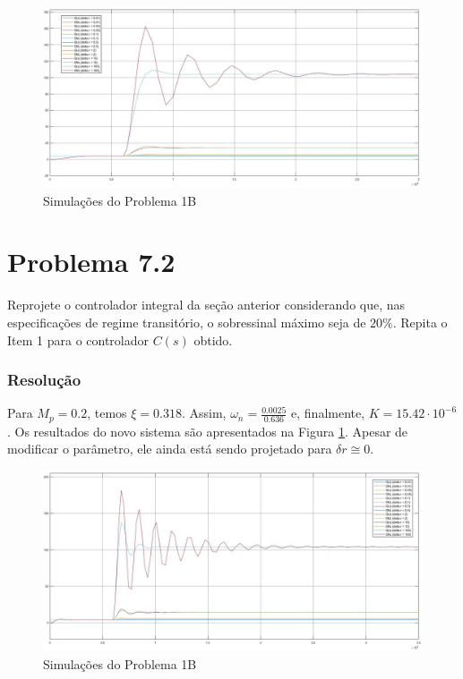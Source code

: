 \documentclass[
]{book}
\theoremstyle{definition}
\theoremstyle{definition}
\theoremstyle{definition}
\theoremstyle{remark}
\begin{document}
\begin{figure}

{\centering \includegraphics[width=0.8\linewidth]{Imagens/Lab7/Resolução/p1B1} 

}

\caption{Simulações do Problema 1B}\label{fig:f1B1}
\end{figure}

\hypertarget{problema-7.2}{%
\section*{Problema 7.2}\label{problema-7.2}}

Reprojete o controlador integral da seção anterior considerando que, nas especificações de regime transitório, o sobressinal máximo seja de \(20\%\). Repita o Item 1 para o controlador \(C(s)\) obtido.

\hypertarget{resoluuxe7uxe3o-21}{%
\subsubsection*{Resolução}\label{resoluuxe7uxe3o-21}}

Para \(M_p = 0.2\), temos \(\xi = 0.318\). Assim, \(\omega_n = \frac{0.0025}{0.636}\) e, finalmente, \(K = 15.42 \cdot 10^{-6}\). Os resultados do novo sistema são apresentados na Figura \ref{fig:f1B1}. Apesar de modificar o parâmetro, ele ainda está sendo projetado para \(\delta r \cong 0\).

\begin{figure}

{\centering \includegraphics[width=0.8\linewidth]{Imagens/Lab7/Resolução/p2} 

}

\caption{Simulações do Problema 1B}\label{fig:f2}
\end{figure}
\end{document}
